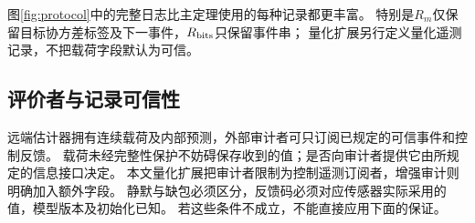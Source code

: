 图\ref{fig:protocol}中的完整日志比主定理使用的每种记录都更丰富。
特别是$R_m$仅保留目标协方差标签及下一事件，$R_{\rm bits}$只保留事件串；
量化扩展另行定义量化遥测记录，不把载荷字段默认为可信。

\subsection{评价者与记录可信性}
远端估计器拥有连续载荷及内部预测，外部审计者可只订阅已规定的可信事件和控制反馈。
载荷未经完整性保护不妨碍保存收到的值；是否向审计者提供它由所规定的信息接口决定。
本文量化扩展把审计者限制为控制遥测订阅者，增强审计则明确加入额外字段。
静默与缺包必须区分，反馈码必须对应传感器实际采用的值，模型版本及初始化已知。
若这些条件不成立，不能直接应用下面的保证。
